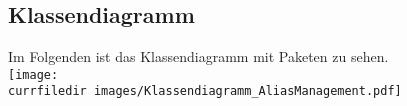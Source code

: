\begin{samepage}
    \subsection{Klassendiagramm}\label{App_AliasManagement_Klassendiagramm}
    Im Folgenden ist das Klassendiagramm mit Paketen zu sehen.\\
    \texttt{[image: \\currfiledir images/Klassendiagramm\_AliasManagement.pdf]}

\end{samepage}